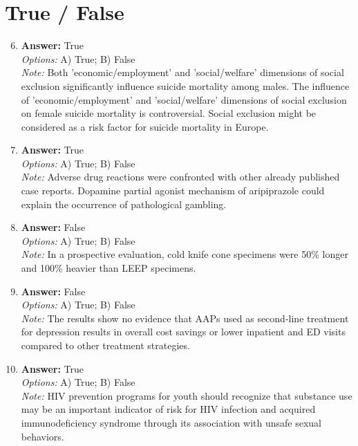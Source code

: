 \documentclass[12pt]{article}
\begin{document}
\section*{True / False}
\begin{enumerate}[label=\arabic*.]
\setcounter{enumi}{5}
\item \textbf{Answer:} True
\\ \textit{Options:} A) True; B) False
\\ \textit{Note:} Both 'economic/employment' and 'social/welfare' dimensions of social exclusion significantly influence suicide mortality among males. The influence of 'economic/employment' and 'social/welfare' dimensions of social exclusion on female suicide mortality is controversial. Social exclusion might be considered as a risk factor for suicide mortality in Europe.
\item \textbf{Answer:} True
\\ \textit{Options:} A) True; B) False
\\ \textit{Note:} Adverse drug reactions were confronted with other already published case reports. Dopamine partial agonist mechanism of aripiprazole could explain the occurrence of pathological gambling.
\item \textbf{Answer:} False
\\ \textit{Options:} A) True; B) False
\\ \textit{Note:} In a prospective evaluation, cold knife cone specimens were 50\% longer and 100\% heavier than LEEP specimens.
\item \textbf{Answer:} False
\\ \textit{Options:} A) True; B) False
\\ \textit{Note:} The results show no evidence that AAPs used as second-line treatment for depression results in overall cost savings or lower inpatient and ED visits compared to other treatment strategies.
\item \textbf{Answer:} True
\\ \textit{Options:} A) True; B) False
\\ \textit{Note:} HIV prevention programs for youth should recognize that substance use may be an important indicator of risk for HIV infection and acquired immunodeficiency syndrome through its association with unsafe sexual behaviors.
\end{enumerate}
\end{document}
